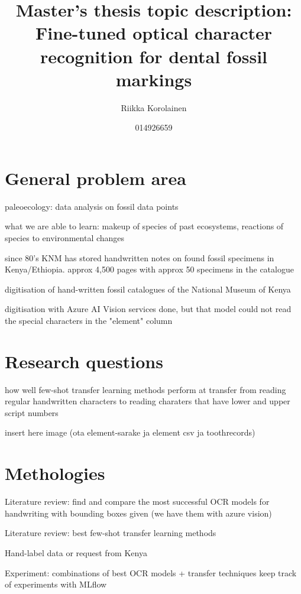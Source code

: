 \documentclass{article}
\title{Master's thesis topic description: Fine-tuned optical character recognition for dental fossil markings}
\author{Riikka Korolainen}
\date{014926659}
\begin{document}
\maketitle

\section{General problem area}

paleoecology: data analysis on fossil data points

what we are able to learn: makeup of species of past ecosystems, reactions
of species to environmental changes

since 80's KNM has stored handwritten notes on found fossil specimens in 
Kenya/Ethiopia. approx 4,500 pages with approx 50 specimens in the catalogue

digitisation of hand-written fossil catalogues of the National Museum of Kenya

digitisation with Azure AI Vision services done, but that model could 
not read the special characters in the "element" column


\section{Research questions}

how well few-shot transfer learning methods perform at transfer from reading 
regular handwritten characters to reading charaters that have lower and 
upper script numbers

insert here image (ota element-sarake ja element csv ja toothrecords)


\section{Methologies}

Literature review: find and compare the most successful OCR models for 
handwriting with bounding boxes given (we have them with azure vision)

Literature review: best few-shot transfer learning methods 

Hand-label data or request from Kenya 

Experiment: combinations of best OCR models + transfer techniques
keep track of experiments with MLflow
\end{document}
